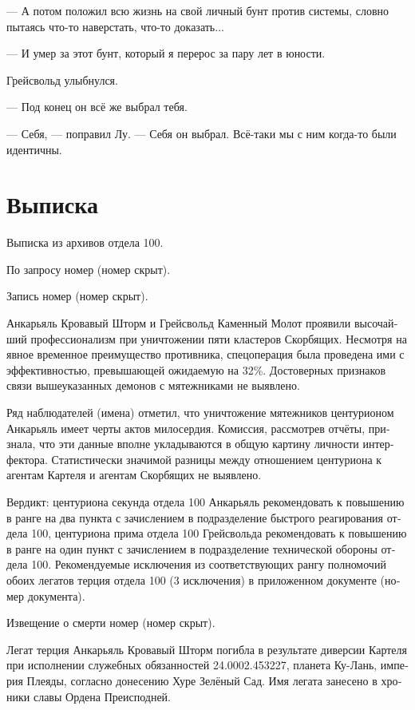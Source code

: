 \documentclass[a4paper,12pt,fleqn]{book}\usepackage{polyglossia}\setdefaultlanguage[babelshorthands=true]{russian}\setotherlanguage{english}\defaultfontfeatures{Ligatures=TeX,Mapping=tex-text}\usepackage{xcolor}\newcommand{\ml}[3]{#2}
\begin{document}
{--- А потом положил всю жизнь на свой личный бунт против системы, словно пытаясь что-то наверстать, что-то доказать...

--- И умер за этот бунт, который я перерос за пару лет в юности.

Грейсвольд улыбнулся.

--- Под конец он всё же выбрал тебя.

--- Себя, --- поправил Лу.
--- Себя он выбрал.
Всё-таки мы с ним когда-то были идентичны.

\section{Выписка}

Выписка из архивов отдела 100.

По запросу номер (номер скрыт).

Запись номер (номер скрыт).

Анкарьяль Кровавый Шторм и Грейсвольд Каменный Молот проявили высочайший профессионализм при уничтожении пяти кластеров Скорбящих.
Несмотря на явное временное преимущество противника, спецоперация была проведена ими с эффективностью, превышающей ожидаемую на 32\%.
Достоверных признаков связи вышеуказанных демонов с мятежниками не выявлено.

Ряд наблюдателей (имена) отметил, что уничтожение мятежников центурионом Анкарьяль имеет черты актов милосердия.
Комиссия, рассмотрев отчёты, признала, что эти данные вполне укладываются в общую картину личности интерфектора.
Статистически значимой разницы между отношением центуриона к агентам Картеля и агентам Скорбящих не выявлено.

Вердикт: центуриона секунда отдела 100 Анкарьяль рекомендовать к повышению в ранге на два пункта с зачислением в подразделение быстрого реагирования отдела 100, центуриона прима отдела 100 Грейсвольда рекомендовать к повышению в ранге на один пункт с зачислением в подразделение технической обороны отдела 100.
Рекомендуемые исключения из соответствующих рангу полномочий обоих легатов терция отдела 100 (3 исключения) в приложенном документе (номер документа).

Извещение о смерти номер (номер скрыт).

Легат терция Анкарьяль Кровавый Шторм погибла в результате диверсии Картеля при исполнении служебных обязанностей 24.0002.453227, планета Ку-Лань, империя Плеяды, согласно донесению Хуре Зелёный Сад.
Имя легата занесено в хроники славы Ордена Преисподней.

}
\end{document}
